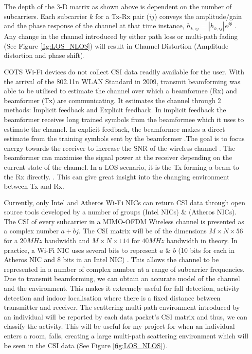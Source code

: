The depth of the 3-D matrix as shown above is dependent on the number of subcarriers. Each subcarrier $k$ for a Tx-Rx pair ($ij$) conveys the amplitude/gain and the phase response of the channel at that time instance, $h_{k,ij} = |h_{k,ij}|e^{j\theta}$ \citep{OFDM}. Any change in the channel introduced by either path loss or multi-path fading (See Figure \ref{fig:LOS_NLOS}) will result in Channel Distortion (Amplitude distortion and phase shift).\par 
COTS Wi-Fi devices do not collect CSI data readily available for the user. With the arrival of the 802.11n WLAN Standard in 2009, transmit beamforming was able to be utilised to estimate the channel over which a beamformee (Rx) and beamformer (Tx) are communicating. It estimates the channel through 2 methods: Implicit feedback and Explicit feedback. In implicit feedback the beamformer receives long trained symbols from the beamformee which it uses to estimate the channel. In explicit feedback, the beamformee makes a direct estimate from the training symbols sent by the beamformer \citep{full802.11nStandard}.The goal is to focus energy towards the receiver to increase the SNR of the wireless channel \citep{beamforming}. The beamformer can maximise the signal power at the receiver depending on the current state of the channel. In a LOS scenario, it is the Tx forming a beam to the Rx directly. \citep{beamforming}. This can give great insight into the changing environment between Tx and Rx. \par
Currently, only Intel and Atheros Wi-Fi NICs can return CSI data through open source tools developed by a number of groups \citep{Halperin_csitool} (Intel NICs) \& \citep{Xie:2015:PPD:2789168.2790124} (Atheros NICs). The CSI of every subcarrier in a MIMO-OFDM Wireless channel is presented as a complex number $a+bj$. The CSI matrix will be of the dimensions $M\times N\times 56$ for a $20MHz$ bandwidth and $M\times N\times 114$ for $40MHz$ bandwidth in theory. In practice, a Wi-Fi NIC uses several bits to represent $a$ \& $b$ (10 bits for each in Atheros NIC and 8 bits in an Intel NIC) \citep{Xie:2015:PPD:2789168.2790124}. This allows the channel to be represented in a number of complex number at a range of subcarrier frequencies. Due to transmit beamforming, we can obtain an accurate model of the channel and the environment. This makes it extremely useful for fall detection, activity detection and indoor localisation where there is a fixed distance between transmitter and receiver. The scattering multi-path environment introduced by an individual will be reported by each data packet's CSI matrix and thus, we can classify the activity. This will be useful for my project for when an individual enters a room, falls, creating a large multi-path scattering environment which will be seen in the CSI data (See Figure \ref{fig:LOS_NLOS}).
